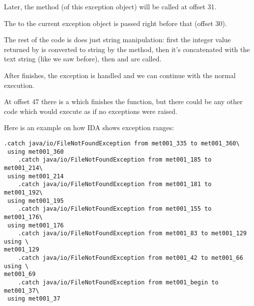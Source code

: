 Later, the  method (of this exception object) will be called at offset 31.

The  to the current exception object is passed right before that (offset 30).

The rest of the code is does just string manipulation: 
first the integer value returned by 
is converted to string by the  method, then it's concatenated with 
the  text string (like we saw before),
then  and  are called.

After  finishes, the exception is handled and we can continue with the normal execution.

At offset 47 there is a  which finishes the \main function, 
but there could be any other code which would execute as if no exceptions were raised.

Here is an example on how IDA shows exception ranges:


\begin{lstlisting}[caption=from some random .class file found on the author's computer]
    .catch java/io/FileNotFoundException from met001_335 to met001_360\
 using met001_360
    .catch java/io/FileNotFoundException from met001_185 to met001_214\
 using met001_214
    .catch java/io/FileNotFoundException from met001_181 to met001_192\
 using met001_195
    .catch java/io/FileNotFoundException from met001_155 to met001_176\
 using met001_176
    .catch java/io/FileNotFoundException from met001_83 to met001_129 using \
met001_129
    .catch java/io/FileNotFoundException from met001_42 to met001_66 using \
met001_69
    .catch java/io/FileNotFoundException from met001_begin to met001_37\
 using met001_37
\end{lstlisting}
